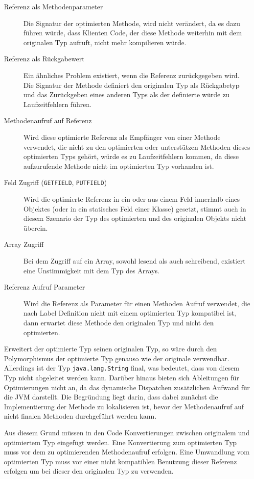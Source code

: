 \begin{description}
	\item[Referenz als Methodenparameter] Die Signatur der 
	optimierten Methode, wird nicht verändert, da es dazu führen würde, dass
	Klienten Code, der diese Methode weiterhin mit dem originalen Typ aufruft, 
	nicht mehr kompilieren würde.
	\item[Referenz als Rückgabewert] Ein ähnliches Problem existiert, wenn die 
	Referenz zurückgegeben wird. Die Signatur der Methode definiert den originalen
	Typ als Rückgabetyp und das Zurückgeben eines anderen Typs als der 
	definierte würde zu Laufzeitfehlern führen.
	\item[Methodenaufruf auf Referenz] Wird diese optimierte Referenz als Empfänger 
	von einer Methode verwendet, die nicht zu den optimierten oder unterstützen
	Methoden dieses optimierten Typs gehört, würde es zu Laufzeitfehlern kommen, 
	da diese aufzurufende Methode nicht im optimierten Typ vorhanden ist. 
	\item[Feld Zugriff (\texttt{GETFIELD}, \texttt{PUTFIELD})] Wird die optimierte 
	Referenz in ein oder aus einem Feld innerhalb eines Objektes (oder in ein 
	statisches Feld einer Klasse) gesetzt, stimmt auch in diesem Szenario der Typ
	des optimierten und des originalen Objekts nicht überein.
	\item[Array Zugriff] Bei dem Zugriff auf ein Array, sowohl lesend als auch 
	schreibend, existiert eine Unstimmigkeit mit dem Typ des Arrays.
	\item[Referenz Aufruf Parameter] Wird die Referenz als Parameter für einen
	Methoden Aufruf verwendet, die nach Label Definition nicht mit einem optimierten 
	Typ kompatibel ist, dann erwartet diese Methode den originalen Typ und nicht den optimierten.
\end{description}

Erweitert der optimierte Typ seinen originalen Typ, so wäre durch den 
Polymorphismus der optimierte Typ genauso wie der originale verwendbar. Allerdings 
ist der Typ \texttt{java.lang.String} final, was bedeutet, dass von diesem Typ nicht 
abgeleitet werden kann. Darüber hinaus bieten sich Ableitungen für Optimierungen nicht
an, da das dynamische Dispatchen zusätzlichen Aufwand für die JVM darstellt. Die Begründung liegt 
darin, dass dabei zunächst die Implementierung der Methode zu lokalisieren ist, bevor 
der Methodenaufruf auf nicht finalen Methoden durchgeführt werden kann.

Aus diesem Grund müssen in den Code Konvertierungen zwischen originalem und optimiertem 
Typ eingefügt werden. Eine Konvertierung zum optimierten Typ muss vor dem zu optimierenden
Methodenaufruf erfolgen. Eine Umwandlung vom optimierten Typ muss vor einer 
nicht kompatiblen Benutzung dieser Referenz erfolgen um bei dieser den originalen Typ 
zu verwenden.

